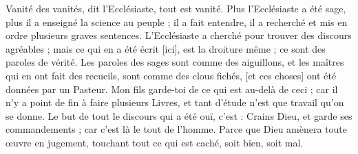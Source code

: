 \begin{multicols}{2}
Vanité des vanités, dit l'Ecclésiaste, tout est vanité.
Plus l'Ecclésiaste a été sage, plus il a enseigné la science au peuple ; il a fait entendre, il a recherché et mis en ordre plusieurs graves sentences.
L'Ecclésiaste a cherché pour trouver des discours agréables ; mais ce qui en a été écrit [ici], est la droiture même ; ce sont des paroles de vérité.
Les paroles des sages sont comme des aiguillons, et les maîtres qui en ont fait des recueils, sont comme des clous fichés, [et ces choses] ont été données par un Pasteur.
Mon fils garde-toi de ce qui est au-delà de ceci ; car il n'y a point de fin à faire plusieurs Livres, et tant d'étude n'est que travail qu'on se donne.
Le but de tout le discours qui a été ouï, c'est : Crains Dieu, et garde ses commandements ; car c'est là le tout de l'homme.
Parce que Dieu amènera toute œuvre en jugement, touchant tout ce qui est caché, soit bien, soit mal.
\PPE{}
\end{multicols}
